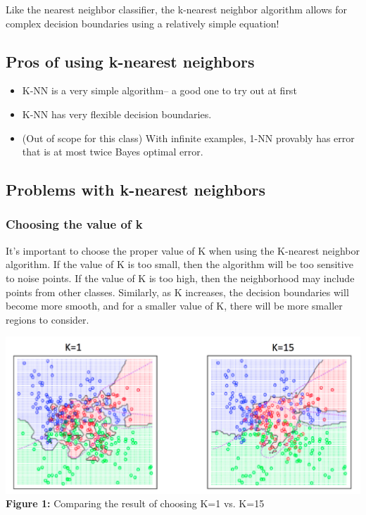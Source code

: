 \documentclass{article}
\begin{document}
Like the nearest neighbor classifier, the k-nearest neighbor algorithm allows for complex decision boundaries using a relatively simple equation!

\subsection{Pros of using k-nearest neighbors}

\begin{itemize}
    \item K-NN is a very simple algorithm-- a good one to try out at first
    \item K-NN has very flexible decision boundaries.
    \item (Out of scope for this class) With infinite examples, 1-NN provably has error that is at most twice Bayes optimal error.
\end{itemize}

\subsection{Problems with k-nearest neighbors}


\subsubsection{Choosing the value of k}

It's important to choose the proper value of K when using the K-nearest neighbor algorithm. If the value of K is too small, then the algorithm will be too sensitive to noise points. If the value of K is too high, then the neighborhood may include points from other classes. Similarly, as K increases, the decision boundaries will become more smooth, and for a smaller value of K, there will be more smaller regions to consider.

\begin{center}
	\includegraphics[scale=0.5]{ChoosingValueOfK.png}\\
    \textbf{Figure 1:} Comparing the result of choosing K=1 vs. K=15\\
\end{center}
\end{document}
